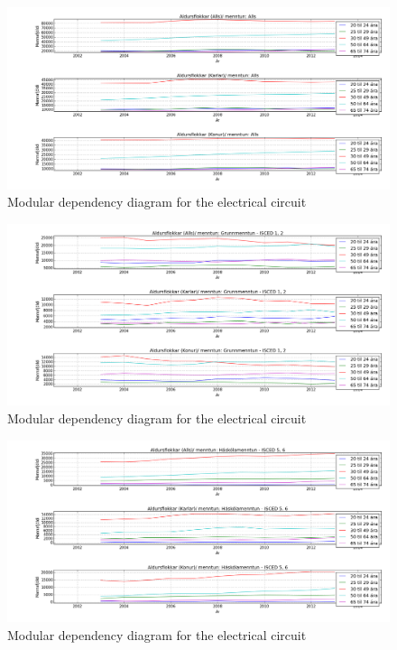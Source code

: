 \documentclass[12pt, svn, draft]{rureport}
\begin{document}
\begin{figure}
	\centering 
	\includegraphics[scale=0.7]{../graphics/mentun_aldrusflokkar_alls.png}
	\caption{Modular dependency diagram for the electrical circuit \label{fig:menntunall}}
\end{figure}

\begin{figure}
	\centering 
	\includegraphics[scale=0.7]{../graphics/mentun_aldrusflokkar_grunnmenntun.png}
	\caption{Modular dependency diagram for the electrical circuit \label{fig:menntungrunn}}
\end{figure}

\begin{figure}
	\centering 
	\includegraphics[scale=0.7]{../graphics/mentun_aldrusflokkar_haskolamenntun.png}
	\caption{Modular dependency diagram for the electrical circuit \label{fig:menntunhs}}
\end{figure}
\end{document}

